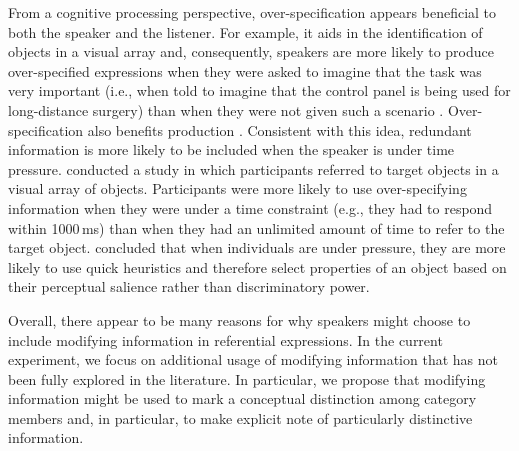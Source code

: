 \documentclass[output=paper]{langsci/langscibook}
\begin{document}
From a cognitive processing perspective, over-specification appears\largerpage
beneficial to both the speaker and the listener. For example, it aids
in the identification of objects in a visual array and, consequently,
speakers are more likely to produce over-specified expressions when
they were asked to imagine that the task was very important (i.e.,
when told to imagine that the control panel is being used for
long-distance surgery) than when they were not given such a scenario \citep{arts2011}. Over-specification also benefits production \citep{pechmann1989incremental}. Consistent with this idea, redundant information is
more likely to be included when the speaker is under time
pressure. \citet{koolen2016distractor} conducted a study in
which participants referred to target objects in a visual array of
objects. Participants were more likely to use over-specifying
information when they were under a time constraint (e.g., they had to
respond within 1000\,ms) than when they had an unlimited amount of time
to refer to the target object. \citet{koolen2016distractor} concluded that
when individuals are under pressure, they are more likely to use quick
heuristics and therefore select properties of an object based on their
perceptual salience rather than discriminatory power.

Overall, there appear to be many reasons for why speakers might choose
to include modifying information in referential expressions. In the
current experiment, we focus on additional usage of modifying
information that has not been fully explored in the literature. In
particular, we propose that modifying information might be used to
mark a conceptual distinction among category members and, in
particular, to make explicit note of particularly distinctive
information.
\end{document}
